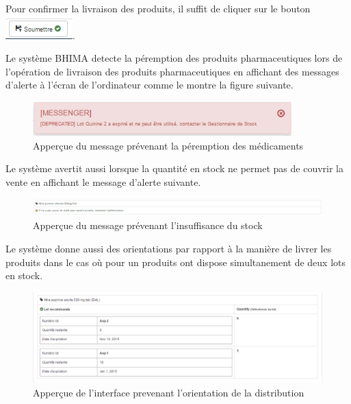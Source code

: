 \documentclass[12pt,a4paper]{report}
\begin{document}
Pour confirmer la livraison des produits, il suffit de cliquer sur le bouton \includegraphics[scale=0.7]{pic/SoumettreDistribution.png}.

Le système BHIMA detecte la péremption des produits pharmaceutiques lors de l'opération de livraison des produits pharmaceutiques en affichant des messages d'alerte à l'écran de l'ordinateur comme le montre la figure suivante.

\begin{figure}[h]
\begin{center}
\includegraphics[width=10cm]{pic/expirationDrug.png}
\end{center}
\caption{Apperçue du message prévenant la péremption des médicaments}
\label{Apperçue du message prévenant la péremption des médicaments}
\end{figure}

Le système avertit aussi lorsque la quantité en stock ne permet pas de couvrir la vente en affichant le message d'alerte suivante.

\begin{figure}[h]
\begin{center}
\includegraphics[width=14cm]{pic/InsuffStock.png}
\end{center}
\caption{Apperçue du message prévenant l'insuffisance du stock}
\label{Apperçue du message prévenant l'insuffisance du stock}
\end{figure}

Le système donne aussi des orientations par rapport à la manière de livrer les produits dans le cas où pour un produits ont dispose simultanement de deux lots en stock.  

\begin{figure}[h]
\begin{center}
\includegraphics[width=14cm]{pic/AstuceDistribution.png}
\end{center}
\caption{Apperçue de l'interface prevenant l'orientation de la distribution}
\label{Apperçue de l'interface prevenant l'orientation de la distribution}
\end{figure}
\end{document}
